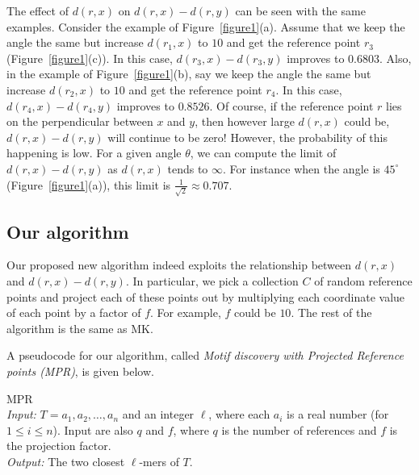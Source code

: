 \documentclass{article}
\theoremstyle{definition}
\theoremstyle{remark}
\begin{document}
The effect of $d(r,x)$ on $d(r,x)-d(r,y)$ can be seen with the same examples. Consider the example of Figure~\ref{figure1}(a). Assume that we keep the angle the same but increase $d(r_1,x)$ to $10$ and get the reference point $r_3$ (Figure~\ref{figure1}(c)). In this case, $d(r_3,x)-d(r_3,y)$ improves to $0.6803$. Also, in the example of Figure~\ref{figure1}(b), say we keep the angle the same but increase $d(r_2,x)$ to $10$ and get the reference point $r_4$. In this case, $d(r_4,x)-d(r_4,y)$ improves to $0.8526$. Of course, if the reference point $r$ lies on the perpendicular between $x$ and $y$, then however large $d(r,x)$ could be, $d(r,x)-d(r,y)$ will continue to be zero! However, the probability of this happening is low. For a given angle $\theta$, we can compute the limit of $d(r,x)-d(r,y)$ as $d(r,x)$ tends to $\infty$. For instance when the angle is $45^\circ$ (Figure~\ref{figure1}(a)), this limit is $\frac{1}{\sqrt 2}\approx 0.707$.

\subsection{Our algorithm}
Our proposed new algorithm indeed exploits the relationship between $d(r,x)$ and $d(r,x)-d(r,y)$. In particular, we pick a collection $C$ of random reference points and project each of these points out by multiplying each coordinate value of each point by a factor of $f$. For example, $f$ could be $10$. The rest of the algorithm is the same as MK.

A pseudocode for our algorithm, called {\em Motif discovery with Projected Reference points (MPR)},  is given below.

 {\sf MPR}\\
{\em Input:} $T=a_1,a_2,\ldots,a_n$ and an integer $\ell$, where each $a_i$ is a real number (for $1\leq i\leq n$). Input are also $q$ and $f$, where $q$ is the number of references and $f$ is the projection factor.\\
{\em Output:} The two closest $\ell$-mers of $T$.\\
\end{document}
